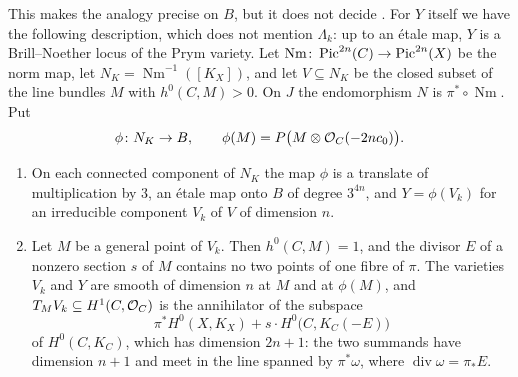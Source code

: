 This makes the analogy precise on $B$, but it does not decide
. For $Y$ itself we have the following description, which
does not mention $\Lambda_{k}$: up to an \'etale map, $Y$ is a
Brill--Noether locus of the Prym variety. Let
$\operatorname{Nm}\colon\operatorname{Pic}^{2n}(C)\to\operatorname{Pic}^{2n}(X)$ be the norm map, let
$N_{K}=\operatorname{Nm}^{-1}([K_{X}])$, and let $V\subseteq N_{K}$ be the
closed subset of the line bundles $M$ with $h^{0}(C,M)>0$. On $J$ the
endomorphism $N$ is $\pi^{*}\circ\operatorname{Nm}$. Put
\[
  \phi\colon N_{K}\to B,\qquad \phi(M)=P\bigl(M\otimes\mathcal{O}_{C}(-2nc_{0})\bigr).
\]

\begin{proposition}\label{prop:prymbn}
\begin{enumerate}[label=\textup{(\alph*)}]
\item On each connected component of $N_{K}$ the map $\phi$ is a translate
of multiplication by $3$, an \'etale map onto $B$ of degree $3^{4n}$, and
$Y=\phi(V_{k})$ for an irreducible component $V_{k}$ of $V$ of dimension
$n$.
\item Let $M$ be a general point of $V_{k}$. Then $h^{0}(C,M)=1$, and the
divisor $E$ of a nonzero section $s$ of $M$ contains no two points of one
fibre of $\pi$. The varieties $V_{k}$ and $Y$ are smooth of dimension $n$ at
$M$ and at $\phi(M)$, and $T_{M}V_{k}\subseteq H^{1}(C,\mathcal{O}_{C})$ is the
annihilator of the subspace
\[
  \pi^{*}H^{0}(X,K_{X})+s\cdot H^{0}\bigl(C,K_{C}(-E)\bigr)
\]
of $H^{0}(C,K_{C})$, which has dimension $2n+1$: the two summands have
dimension $n+1$ and meet in the line spanned by $\pi^{*}\omega$, where
$\operatorname{div}\omega=\pi_{*}E$.
\end{enumerate}
\end{proposition}

